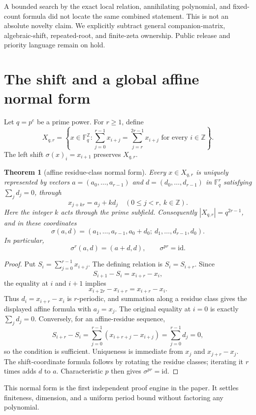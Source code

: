 \documentclass[11pt,a4paper]{amsart}
\newtheorem{theorem}{Theorem}[section]
\theoremstyle{definition}
\theoremstyle{remark}
\newcommand{\Fq}{\mathbb F_q}
\begin{document}
A bounded search by the exact local relation, annihilating polynomial, and
fixed-count formula did not locate the same combined statement.  This is not
an absolute novelty claim.  We explicitly subtract general companion-matrix,
algebraic-shift, repeated-root, and finite-zeta ownership.  Public release and
priority language remain on hold.

\section{The shift and a global affine normal form}

Let $q=p^e$ be a prime power.  For $r\geq1$, define
\[
 X_{q,r}=\left\{x\in\Fq^{\mathbb Z}:
 \sum_{j=0}^{r-1}x_{i+j}=\sum_{j=r}^{2r-1}x_{i+j}
 \text{ for every }i\in\mathbb Z\right\}.
\]
The left shift $\sigma(x)_i=x_{i+1}$ preserves $X_{q,r}$.

\begin{theorem}[affine residue-class normal form]\label{thm:normal}
Every $x\in X_{q,r}$ is uniquely represented by vectors
$a=(a_0,\ldots,a_{r-1})$ and $d=(d_0,\ldots,d_{r-1})$ in $\Fq^r$ satisfying
$\sum_jd_j=0$, through
\[
 \boxed{x_{j+kr}=a_j+k d_j
 \quad(0\leq j<r,\ k\in\mathbb Z).}
\]
Here the integer $k$ acts through the prime subfield.  Consequently
$|X_{q,r}|=q^{2r-1}$, and in these coordinates
\[
 \sigma(a,d)=
 (a_1,\ldots,a_{r-1},a_0+d_0;\
  d_1,\ldots,d_{r-1},d_0).
\]
In particular,
\[
 \sigma^r(a,d)=(a+d,d),
 \qquad \sigma^{pr}=\mathrm{id}.
\]
\end{theorem}

\begin{proof}
Put $S_i=\sum_{j=0}^{r-1}x_{i+j}$.  The defining relation is
$S_i=S_{i+r}$.  Since
\[
 S_{i+1}-S_i=x_{i+r}-x_i,
\]
the equality at $i$ and $i+1$ implies
\[
 x_{i+2r}-x_{i+r}=x_{i+r}-x_i.
\]
Thus $d_i=x_{i+r}-x_i$ is $r$-periodic, and summation along a residue class
gives the displayed affine formula with $a_j=x_j$.  The original equality at
$i=0$ is exactly $\sum_jd_j=0$.  Conversely, for an affine-residue sequence,
\[
 S_{i+r}-S_i=\sum_{j=0}^{r-1}(x_{i+r+j}-x_{i+j})
 =\sum_{j=0}^{r-1}d_j=0,
\]
so the condition is sufficient.  Uniqueness is immediate from $x_j$ and
$x_{j+r}-x_j$.  The shift-coordinate formula follows by rotating the residue
classes; iterating it $r$ times adds $d$ to $a$.  Characteristic $p$ then
gives $\sigma^{pr}=\mathrm{id}$.
\end{proof}

This normal form is the first independent proof engine in the paper.  It
settles finiteness, dimension, and a uniform period bound without factoring
any polynomial.
\end{document}
